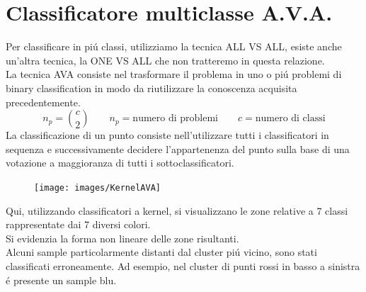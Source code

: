 \documentclass[12pt]{article}
\begin{document}
\newpage
\section{Classificatore multiclasse A.V.A.}

Per classificare in piú classi, utilizziamo la tecnica ALL VS ALL, esiste anche un'altra tecnica, la ONE VS ALL che non tratteremo in questa relazione. \\
La tecnica AVA consiste nel trasformare il problema in uno o piú problemi di binary classification in modo da riutilizzare la conoscenza acquisita precedentemente. \\
$$
  n_p = {c \choose 2} \qquad n_p = \text{numero di problemi} \qquad c = \text{numero di classi}
$$
La classificazione di un punto consiste nell'utilizzare tutti i classificatori in sequenza e successivamente
decidere l'appartenenza del punto sulla base di una votazione a maggioranza di tutti i sottoclassificatori.
\begin{figure}[H]
  \centering
  \texttt{[image: images/KernelAVA]}
\end{figure}
Qui, utilizzando classificatori a kernel, si visualizzano le zone relative a 7 classi rappresentate dai 7 diversi colori. \\
Si evidenzia la forma non lineare delle zone risultanti. \\
Alcuni sample particolarmente distanti dal cluster piú vicino, sono stati classificati erroneamente.
Ad esempio, nel cluster di punti rossi in basso a sinistra é presente un sample blu.
\end{document}
